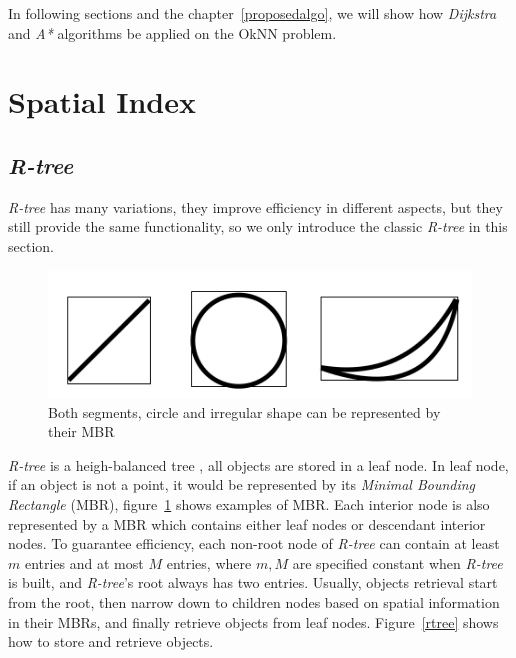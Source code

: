 In following sections and the chapter~\ref{proposedalgo}, we will show how \textit{Dijkstra} and
\textit{A*} algorithms be applied on the OkNN problem.

\section{Spatial Index}\label{lrindex}

\subsection{\textit{R-tree}}

\textit{R-tree} has many variations\cite{guttman1984r,beckmann1990r,sellis1987r+,kamel1993hilbert},
they improve efficiency in different aspects,
but they still provide the same functionality,
so we only introduce the classic \textit{R-tree} in this section.

\begin{figure}[htp]
  \centering
  \includegraphics[width=.8\linewidth]{pic/mbr.PNG}
  \caption{\small Both segments, circle and irregular shape can be represented by their MBR}
  \label{mbr}
\end{figure}

\textit{R-tree} is a heigh-balanced tree \cite{guttman1984r}, all objects are stored in a leaf
node. In leaf node, if an object is not a point, it would be represented by its \textit{Minimal Bounding
Rectangle} (MBR), figure~\ref{mbr} shows examples of MBR. Each interior node is also
represented by a MBR which contains either leaf nodes or descendant interior nodes.
To guarantee efficiency, each non-root node of \textit{R-tree} can contain at least $m$ entries
and at most $M$ entries, where $m, M$ are specified constant when \textit{R-tree} is built, and
\textit{R-tree}'s root always has two entries. 
Usually, objects retrieval start from the root,
then narrow down to children nodes based on spatial information in their MBRs, and finally
retrieve objects from leaf nodes.
Figure~\ref{rtree} shows how to store and retrieve objects.

